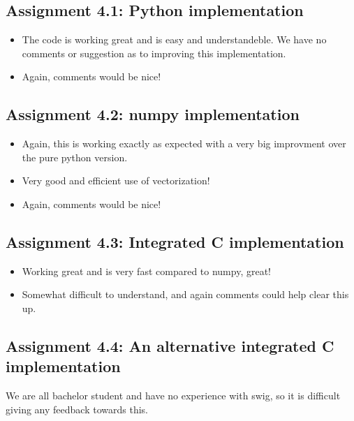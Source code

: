 \documentclass[a4paper]{article}
\begin{document}
\subsection*{Assignment 4.1: Python implementation}
\begin{itemize}
\item The code is working great and is easy and understandeble. We have no comments or suggestion as to improving this implementation.
\item Again, comments would be nice!
\end{itemize}


\subsection*{Assignment 4.2:  numpy implementation} \label{sec:assignment5.2}
\begin{itemize}
\item Again, this is working exactly as expected with a very big improvment over the pure python version.
\item Very good and efficient use of vectorization!
\item Again, comments would be nice!
\end{itemize}


\subsection*{Assignment 4.3: Integrated C implementation}
\begin{itemize}
\item Working great and is very fast compared to numpy, great!
\item Somewhat difficult to understand, and again comments could help clear this up.

\end{itemize}

\subsection*{Assignment 4.4:  An alternative integrated C implementation}
We are all bachelor student and have no experience with swig, so it is difficult giving any feedback towards this.

\end{document}
